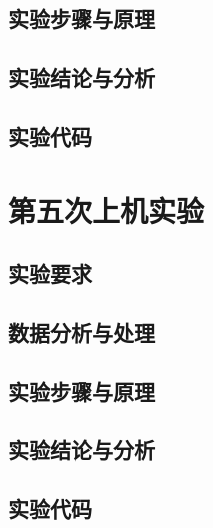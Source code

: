 \documentclass[a4paper,12pt]{report}
\begin{document}
\section{实验步骤与原理}
\section{实验结论与分析}
\section{实验代码}
\clearpage
\chapter{第五次上机实验}
\section{实验要求}
\section{数据分析与处理}
\section{实验步骤与原理}
\section{实验结论与分析}
\section{实验代码}
\printbibliography
\end{document}

